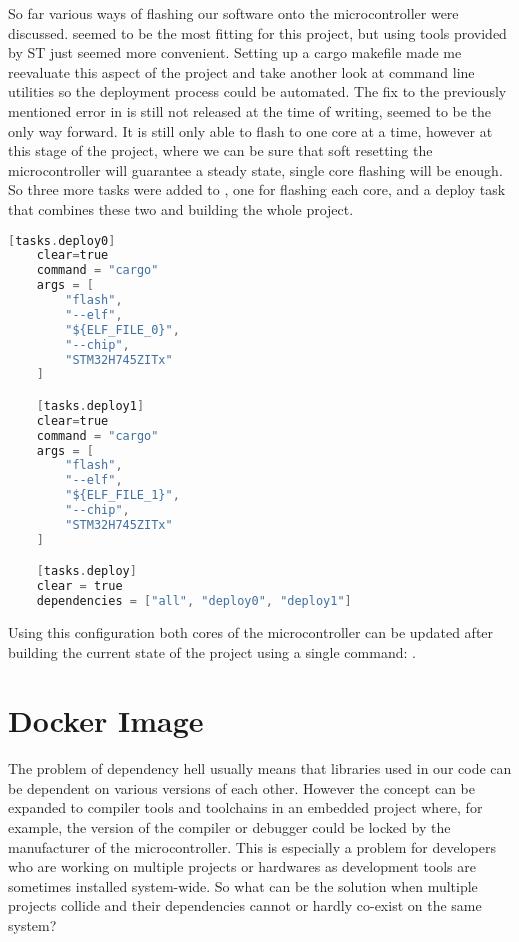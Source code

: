 So far various ways of flashing our software onto the microcontroller were discussed.  seemed to be the most fitting for this project, but using tools provided by ST just seemed more convenient. Setting up a cargo makefile made me reevaluate this aspect of the project and take another look at command line utilities so the deployment process could be automated. The fix to the previously mentioned error in  is still not released at the time of writing,  seemed to be the only way forward. It is still only able to flash to one core at a time, however at this stage of the project, where we can be sure that soft resetting the microcontroller will guarantee a steady state, single core flashing will be enough. So three more tasks were added to , one for flashing each core, and a deploy task that combines these two and building the whole project.

\begin{lstlisting}[language=C,frame=single,float=!ht,label={lst:cargo-make-deploy},caption={Cargo Tasks to Flash the MCU}]
    [tasks.deploy0]
    clear=true
    command = "cargo"
    args = [
        "flash",
        "--elf",
        "${ELF_FILE_0}",
        "--chip",
        "STM32H745ZITx"
    ]

    [tasks.deploy1]
    clear=true
    command = "cargo"
    args = [
        "flash",
        "--elf",
        "${ELF_FILE_1}",
        "--chip",
        "STM32H745ZITx"
    ]

    [tasks.deploy]
    clear = true
    dependencies = ["all", "deploy0", "deploy1"]
\end{lstlisting}

Using this configuration both cores of the microcontroller can be updated after building the current state of the project using a single command: .

\section{Docker Image}

The problem of dependency hell \cite{DependencyHell} usually means that libraries used in our code can be dependent on various versions of each other. However the concept can be expanded to compiler tools and toolchains in an embedded project where, for example, the version of the compiler or debugger could be locked by the manufacturer of the microcontroller. This is especially a problem for developers who are working on multiple projects or hardwares as development tools are sometimes installed system-wide. So what can be the solution when multiple projects collide and their dependencies cannot or hardly co-exist on the same system?

